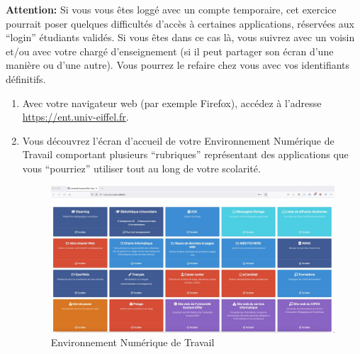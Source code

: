 \documentclass{article}
\begin{document}
\begin{exercice}

\textbf{Attention: } Si vous vous êtes loggé avec un compte temporaire, cet exercice pourrait poser quelques difficultés d'accès à certaines applications, réservées aux ``login'' étudiants validés.
Si vous êtes dans ce cas là, vous suivrez avec un voisin et/ou avec votre chargé d'enseignement (si il peut partager son écran d'une manière ou d'une autre). Vous pourrez le refaire chez vous avec vos identifiants définitifs.

\begin{enumerate}
\item Avec votre navigateur web (par exemple Firefox), accédez à l'adresse \url{https://ent.univ-eiffel.fr}.
\item Vous découvrez l'écran d'accueil de votre Environnement Numérique de Travail comportant plusieurs ``rubriques'' représentant des applications que vous ``pourriez'' utiliser tout au long de votre scolarité.

\begin{figure}[h!]
    \begin{center}
    \includegraphics[scale=0.25]{ENT.jpg}
     \caption{Environnement Numérique de Travail}
     \end{center}
\end{figure}    

\end{enumerate}

\end{exercice}
\end{document}
